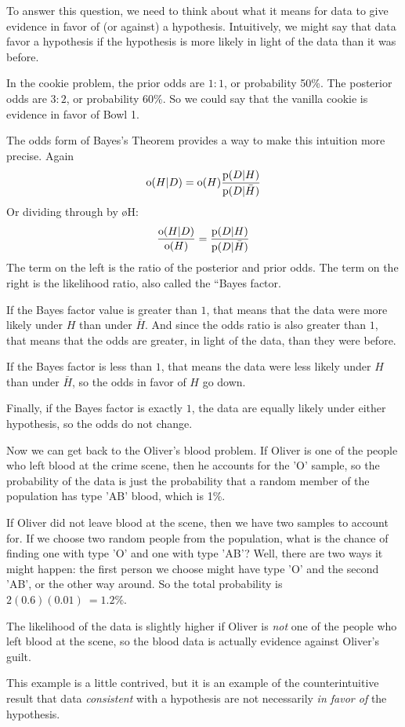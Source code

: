 \documentclass[12pt]{book}
\begin{document}
To answer this question, we need to think about what it means
for data to give evidence in favor of (or against) a hypothesis.
Intuitively, we might say that data favor a hypothesis if the
hypothesis is more likely in light of the data than it was before.

In the cookie problem, the prior odds are $1:1$, or probability 50\%.
The posterior odds are $3:2$, or probability 60\%.  So we could say
that the vanilla cookie is evidence in favor of Bowl 1.

The odds form of Bayes's Theorem provides a way to make this
intuition more precise.  Again
%
\[ \mathrm{o}(H|D) = \mathrm{o}(H) \frac{\mathrm{p}(D|H)}{\mathrm{p}(D|\bar{H})} \]
%
Or dividing through by \o{H}:
%
\[ \frac{\mathrm{o}(H|D)}{\mathrm{o}(H)} = \frac{\mathrm{p}(D|H)}{\mathrm{p}(D|\bar{H})} \]
%
The term on the left is the ratio of the posterior and prior odds.
The term on the right is the likelihood ratio, also called the ``Bayes
factor.

If the Bayes factor value is greater than $1$, that means that the
data were more likely under $H$ than under $\bar{H}$.  And since the
odds ratio is also greater than $1$, that means that the odds are
greater, in light of the data, than they were before.

If the Bayes factor is less than $1$, that means the data were
less likely under $H$ than under $\bar{H}$, so the odds in
favor of $H$ go down.

Finally, if the Bayes factor is exactly $1$, the data are equally
likely under either hypothesis, so the odds do not change.

Now we can get back to the Oliver's blood problem.  If Oliver is
one of the people who left blood at the crime scene, then he
accounts for the 'O' sample, so the probability of the data
is just the probability that a random member of the population
has type 'AB' blood, which is 1\%.

If Oliver did not leave blood at the scene, then we have two
samples to account for.  If we choose two random people from
the population, what is the chance of finding one with type 'O'
and one with type 'AB'?  Well, there are two ways it might happen:
the first person we choose might have type 'O' and the second
'AB', or the other way around.  So the total probability is
$2 (0.6) (0.01)\ = 1.2\%$.

The likelihood of the data is slightly higher if Oliver is
{\it not} one of the people who left blood at the scene, so
the blood data is actually evidence against Oliver's guilt.

This example is a little contrived, but it is an example of
the counterintuitive result that data {\it consistent} with
a hypothesis are not necessarily {\it in favor of}
the hypothesis.
\end{document}

